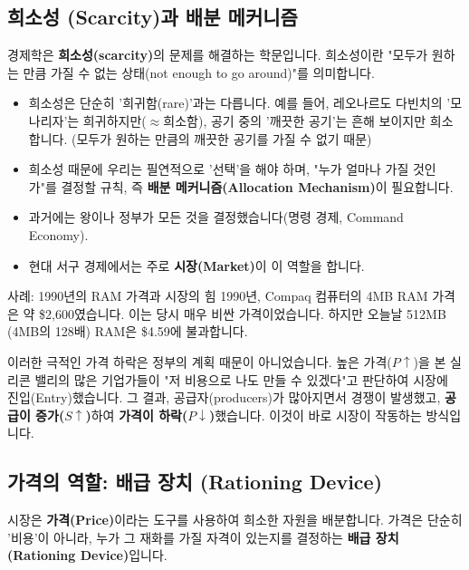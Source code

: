 \documentclass[11pt,a4paper]{article}
\theoremstyle{definition}
\begin{document}
\subsection{희소성 (Scarcity)과 배분 메커니즘}

경제학은 \textbf{희소성(scarcity)}의 문제를 해결하는 학문입니다.
희소성이란 "모두가 원하는 만큼 가질 수 없는 상태(not enough to go around)"를 의미합니다.

\begin{itemize}
    \item 희소성은 단순히 '희귀함(rare)'과는 다릅니다. 예를 들어, 레오나르도 다빈치의 '모나리자'는 희귀하지만($\approx$희소함), 공기 중의 '깨끗한 공기'는 흔해 보이지만 희소합니다. (모두가 원하는 만큼의 깨끗한 공기를 가질 수 없기 때문)
    \item 희소성 때문에 우리는 필연적으로 '선택'을 해야 하며, "누가 얼마나 가질 것인가"를 결정할 규칙, 즉 \textbf{배분 메커니즘(Allocation Mechanism)}이 필요합니다.
    \item 과거에는 왕이나 정부가 모든 것을 결정했습니다(명령 경제, Command Economy).
    \item 현대 서구 경제에서는 주로 \textbf{시장(Market)}이 이 역할을 합니다.
\end{itemize}

\begin{mybox}{사례: 1990년의 RAM 가격과 시장의 힘}
    1990년, Compaq 컴퓨터의 4MB RAM 가격은 약 \$2,600였습니다. 이는 당시 매우 비싼 가격이었습니다. 하지만 오늘날 512MB (4MB의 128배) RAM은 \$4.59에 불과합니다.

    이러한 극적인 가격 하락은 정부의 계획 때문이 아니었습니다.
    높은 가격($P \uparrow$)을 본 실리콘 밸리의 많은 기업가들이 "저 비용으로 나도 만들 수 있겠다"고 판단하여 시장에 진입(Entry)했습니다.
    그 결과, 공급자(producers)가 많아지면서 경쟁이 발생했고, \textbf{공급이 증가($S \uparrow$)}하여 \textbf{가격이 하락($P \downarrow$)}했습니다.
    이것이 바로 시장이 작동하는 방식입니다.
\end{mybox}

\subsection{가격의 역할: 배급 장치 (Rationing Device)}

시장은 \textbf{가격(Price)}이라는 도구를 사용하여 희소한 자원을 배분합니다.
가격은 단순히 '비용'이 아니라, 누가 그 재화를 가질 자격이 있는지를 결정하는 \textbf{배급 장치(Rationing Device)}입니다.
\end{document}
